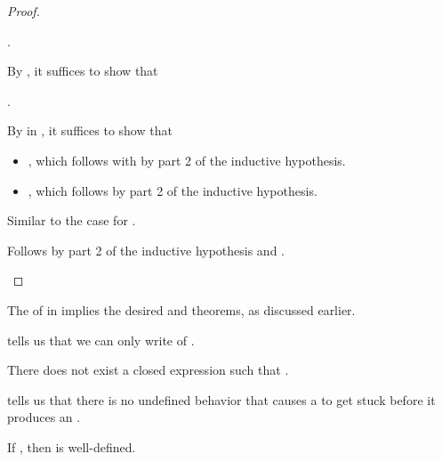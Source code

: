 \begin{proof}
\begin{proofcases}
    \im{\styjudg{\absccmodel{\tlenv}}{\sappe{\absccmodel{\te}}{\absccmodel{\tepr}}}{\absccmodel{({\tpity{\tx}{\subst{\tA}{\tepr}{\txpr}}{\subst{\tB}{\tepr}{\txpr}}})}}}.

    By , it suffices to show that

    \im{\styjudg{\absccmodel{\tlenv}}{\sappe{\absccmodel{\te}}{\absccmodel{\tepr}}}{\spity{\sx}{\subst{\absccmodel{\tA}}{\absccmodel{\tepr}}{\sxpr}}{\subst{\absccmodel{\tB}}{\absccmodel{\tepr}}{\sxpr}}}}.

    By  in \slang, it suffices to show that
    \begin{itemize}
    \item
      \im{\styjudg{\absccmodel{\tlenv}}{\absccmodel{\te}}{\spity{\sxpr}{\sApr}{\spity{\sx}{\absccmodel{\tA}}{\absccmodel{\tB}}}}},
      which follows with \im{\sApr = \absccmodel{\tApr}} by part 2 of the inductive hypothesis.
    \item \im{\styjudg{\absccmodel{\tlenv}}{\absccmodel{\tepr}}{\sApr}}, which follows by part 2 of the
      inductive hypothesis.
    \end{itemize}

    \item {}

      Similar to the case for .

    \item {}

      Follows by part 2 of the inductive hypothesis and .
  \end{proofcases}
\end{proof}

The  of \tlang in \slang implies the desired  and
 theorems, as discussed earlier.

 tells us that we can only write  of 
.
\begin{theorem}
  \label{thm:abs-cc:m:sound}
  There does not exist a closed expression \im{\te} such that \im{\ttyjudg{\cdot}{\te}{\tFalse}}.
\end{theorem}

 tells us that there is no undefined behavior that causes a
 to get stuck before it produces an .
\begin{theorem}
  \label{thm:abs-cc:m:safe}
  If \im{\wf{}{\te}}, then \im{\teval{\te}} is well-defined.
\end{theorem}
